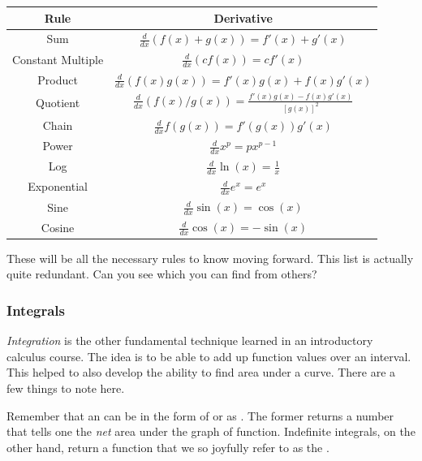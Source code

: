     \begin{table}[H]
        \centering
        \renewcommand{\arraystretch}{2.5}
        \begin{tabular}{c|c}
            Rule & Derivative\\
            \hline
            Sum & $\displaystyle{\frac{d}{dx}(f(x)+g(x))=f'(x)+g'(x)}$\\
            \hline
            Constant Multiple & $\displaystyle{\frac{d}{dx}(c f(x))=cf'(x)}$\\
            \hline
            Product & $\displaystyle{\frac{d}{dx}(f(x)g(x))=f'(x)g(x)+f(x)g'(x)}$\\
            \hline
            Quotient & $\displaystyle{\frac{d}{dx}(f(x)/g(x))}=\frac{f'(x)g(x)-f(x)g'(x)}{\left[g(x)\right]^2}$\\
            \hline
            Chain & $\displaystyle{\frac{d}{dx}f(g(x))=f'(g(x))g'(x)}$\\
            \hline
            Power & $\displaystyle{\frac{d}{dx}x^p=px^{p-1}}$\\
            \hline
            Log & $\displaystyle{\frac{d}{dx}\ln(x)=\frac{1}{x}}$\\
            \hline
            Exponential & $\displaystyle{\frac{d}{dx}e^x=e^x}$\\
            \hline
            Sine & $\displaystyle{\frac{d}{dx}\sin(x)=\cos(x)}$\\
            \hline
            Cosine & $\displaystyle{\frac{d}{dx}\cos(x)=-\sin(x)}$
        \end{tabular}
        \label{tab:der_rules}
    \end{table}
    These will be all the necessary rules to know moving forward.  This list is actually quite redundant. Can you see which you can find from others?


    \subsubsection{Integrals}
    \emph{Integration} is the other fundamental technique learned in an introductory calculus course.  The idea is to be able to add up function values over an interval. This helped to also develop the ability to find area under a curve.  There are a few things to note here.

    Remember that an  can be in the form of  or as . The former returns a number that tells one the \emph{net} area under the graph of function.  Indefinite integrals, on the other hand, return a function that we so joyfully refer to as the .

